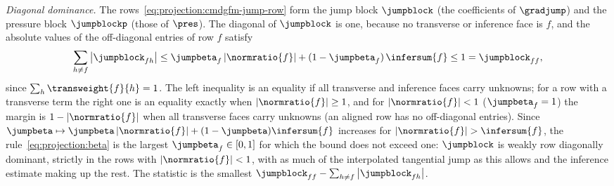 \emph{Diagonal dominance.} The rows~\cref{eq:projection:cmdgfm-jump-row}
form the jump block $\jumpblock$ (the coefficients of $\gradjump$) and the
pressure block $\jumpblockp$ (those of $\pres$). The diagonal of $\jumpblock$
is one, because no transverse or inference face is $f$, and the absolute
values of the off-diagonal entries of row $f$ satisfy
\begin{equation}\label{eq:projection:dominance}
  \sum_{h\neq f}\abs{\jumpblock_{fh}}\le\jumpbeta_f\abs{\normratio{f}}+(1-\jumpbeta_f)\,\infersum{f}\le1=\jumpblock_{ff},
\end{equation}
since $\sum_h\transweight{f}{h}=1$. The left inequality is an equality if all
transverse and inference faces carry unknowns; for a row with a transverse
term the right one is an equality exactly when $\abs{\normratio{f}}\ge1$, and
for $\abs{\normratio{f}}<1$ ($\jumpbeta_f=1$) the margin is
$1-\abs{\normratio{f}}$ when all transverse faces carry unknowns (an aligned
row has no off-diagonal entries). Since
$\jumpbeta\mapsto\jumpbeta\abs{\normratio{f}}+(1-\jumpbeta)\infersum{f}$ increases
for $\abs{\normratio{f}}>\infersum{f}$, the rule~\cref{eq:projection:beta} is
the largest $\jumpbeta_f\in[0,1]$ for which the bound does not exceed one:
$\jumpblock$ is weakly row diagonally dominant, strictly in the rows with
$\abs{\normratio{f}}<1$, with as much of the interpolated tangential jump as
this allows and the inference estimate making up the rest. The statistic
 is the smallest
$\jumpblock_{ff}-\sum_{h\neq f}\abs{\jumpblock_{fh}}$.

